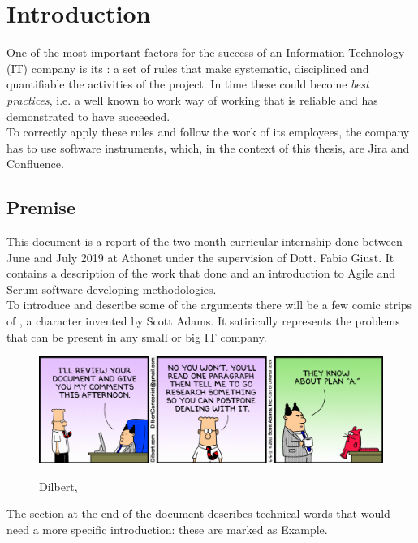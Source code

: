 \chapter{Introduction}
\label{introduction}
One of the most important factors for the success of an Information Technology (IT) company is its : a set of rules that make systematic, disciplined and quantifiable the activities of the project.
In time these could become \textit{best practices}, i.e. a well known to work way of working that is reliable and has demonstrated to have succeeded.\\
To correctly apply these rules and follow the work of its employees, the company has to use software instruments, which, in the context of this thesis, are Jira and Confluence.

\section{Premise}
	This document is a report of the two month curricular internship done between June and July 2019 at Athonet under the supervision of Dott. Fabio Giust.
	It contains a description of the work that done and an introduction to Agile and Scrum software developing methodologies.\\
	To introduce and describe some of the arguments there will be a few comic strips of , a character invented by Scott Adams\cite{dilbert}.
	It satirically represents the problems that can be present in any small or big IT company.
	\begin{figure}[H]
		\centering
		\includegraphics[width=1\textwidth]{resources/Dissertate}\\
		\caption[Dilbert, ]{Dilbert, }
	\end{figure}
	The  section at the end of the document describes technical words that would need a more specific introduction: these are marked as \gls{Example}.\\
	
